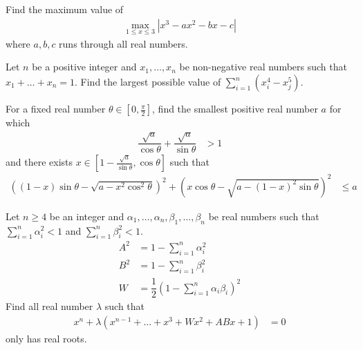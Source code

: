 \documentclass{subfile}
\begin{document}
		\begin{problem}
			Find the maximum value of
				\begin{align*}
					\max\limits_{1\leq x\leq 3}|x^{3}-ax^{2}-bx-c|
				\end{align*}
			where $a,b,c$ runs through all real numbers.
		\end{problem}
	
		\begin{problem}
			Let $n$ be a positive integer and $x_{1},\ldots,x_{n}$ be non-negative real numbers such that $x_{1}+\ldots+x_{n}=1$. Find the largest possible value of $\sum_{i=1}^{n}(x_{i}^{4}-x_{j}^{5})$.
		\end{problem}
	
		\begin{problem}
			For a fixed real number $\theta\in\left[0,\frac{\pi}{2}\right]$, find the smallest positive real number $a$ for which
				\begin{align*}
					\dfrac{\sqrt{a}}{\cos{\theta}}+\dfrac{\sqrt{a}}{\sin{\theta}}
						& > 1
				\end{align*}
			and there exists $x\in\left[1-\frac{\sqrt{a}}{\sin{\theta}},\cos{\theta}\right]$ such that
				\begin{align*}
					\left((1-x)\sin{\theta}-\sqrt{a-x^{2}\cos^{2}{\theta}}\right)^{2}+\left(x\cos{\theta}-\sqrt{a-(1-x)^{2}\sin{\theta}}\right)^{2}
						& \leq a
				\end{align*}
		\end{problem}
	
		\begin{problem}
			Let $n\geq 4$ be an integer and $\alpha_{1},\ldots,\alpha_{n},\beta_{1},\ldots,\beta_{n}$ be real numbers such that $\sum_{i=1}^{n}\alpha_{i}^{2}<1$ and $\sum_{i=1}^{n}\beta_{i}^{2}<1$.
				\begin{align*}
					A^{2}
						& = 1-\sum_{i=1}^{n}\alpha_{i}^{2}\\
					B^{2}
						& = 1-\sum_{i=1}^{n}\beta_{i}^{2}\\
					W
						& = \dfrac{1}{2}\left(1-\sum_{i=1}^{n}\alpha_{i}\beta_{i}\right)^{2}
				\end{align*}
			Find all real number $\lambda$ such that
				\begin{align*}
					x^{n}+\lambda(x^{n-1}+\ldots+x^{3}+Wx^{2}+ABx+1)
						& = 0
				\end{align*}
			only has real roots.
		\end{problem}
	
\end{document}
